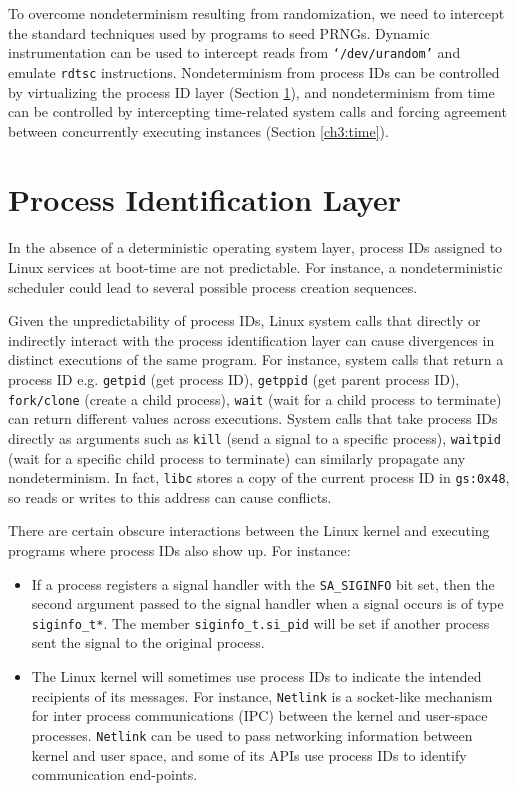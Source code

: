 To overcome nondeterminism resulting from randomization, 
we need to intercept the standard techniques
used by programs to seed PRNGs.
Dynamic instrumentation can be used to 
intercept reads from \texttt{`/dev/urandom'}
and emulate \texttt{rdtsc} instructions.
Nondeterminism from process IDs
can be controlled by virtualizing the process ID
layer (Section \ref{ch3:pid}), and nondeterminism
from time can be controlled by intercepting
time-related system calls and forcing
agreement between concurrently executing 
instances (Section \ref{ch3:time}).

\section{Process Identification Layer} \label{ch3:pid}

In the absence of a deterministic operating system layer, process IDs assigned
to Linux services at boot-time are not predictable.
For instance, a nondeterministic scheduler 
could lead to several possible process creation sequences.

Given the unpredictability of process IDs,
Linux system calls that directly or indirectly
interact with the process identification layer can cause divergences
in distinct executions of the same program.
For instance, system calls that return a process ID e.g.
\texttt{getpid} (get process ID), \texttt{getppid} (get
parent process ID), \texttt{fork/clone} (create a child process),
\texttt{wait} (wait for a child process to terminate)
can return different values across executions. System calls that take process IDs 
directly as arguments such as \texttt{kill} (send a signal to a specific
process), \texttt{waitpid} (wait for a specific child process to terminate)
can similarly propagate any nondeterminism.
In fact, \texttt{libc} stores a copy of the current process ID in \texttt{gs:0x48},
so reads or writes to this address can cause conflicts.

There are certain obscure interactions
between the Linux kernel and executing programs
where process IDs also show up. For instance:
\begin{itemize} 
\item If a process registers a signal handler with the \texttt{SA\_SIGINFO}
bit set, then the second argument passed
to the signal handler when a signal occurs is of type \texttt{siginfo\_t*}.
The member \texttt{siginfo\_t.si\_pid} will
be set if another process sent the signal 
to the original process. 
\item The Linux kernel will sometimes use process IDs 
to indicate the intended recipients of its messages. 
For instance, \texttt{Netlink} is a socket-like
mechanism for inter process communications (IPC)
between the kernel and user-space processes.
\texttt{Netlink} can be used to pass
networking information between kernel
and user space, and some of its APIs 
use process IDs to identify communication
end-points. \end{itemize}

